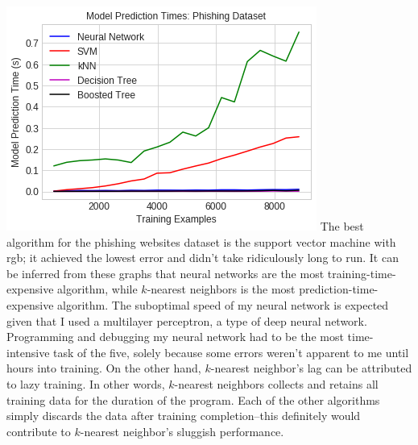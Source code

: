 \documentclass[11pt, a4paper]{article} %
\begin{document}
\includegraphics[scale=0.55]{TIme_Predict.png}
\newline
The best algorithm for the phishing websites dataset is the support vector machine with rgb; it achieved the lowest error and didn't take ridiculously long to run. It can be inferred from these graphs that neural networks are the most training-time-expensive algorithm, while $k$-nearest neighbors is the most prediction-time-expensive algorithm. The suboptimal speed of my neural network is expected given that I used a multilayer perceptron, a type of deep neural network. Programming and debugging my neural network had to be the most time-intensive task of the five, solely because some errors weren't apparent to me until hours into training. On the other hand, $k$-nearest neighbor's lag can be attributed to lazy training. In other words, $k$-nearest neighbors collects and retains all training data for the duration of the program. Each of the other algorithms simply discards the data after training completion--this definitely would contribute to $k$-nearest neighbor's sluggish performance.



\end{document}
